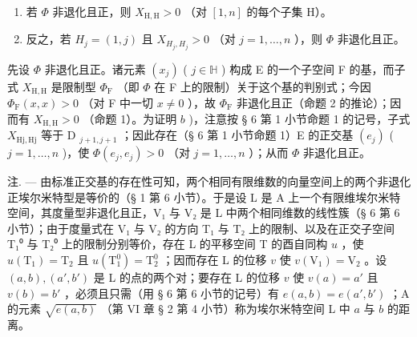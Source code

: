 \begin{enumerate}
\def\labelenumi{\alph{enumi})}
\item
  若 \(\Phi\) 非退化且正，则 \(X_{\mathrm{H,H}} > 0\) （对 \([1, n]\) 的每个子集 H）。
\item
  反之，若 \(H_{j} = (1, j)\) 且 \(X_{H_{j}, H_{j}} > 0\) （对 \(j = 1, \ldots, n\) ），则 \(\Phi\) 非退化且正。
\end{enumerate}

先设 \(\Phi\) 非退化且正。诸元素 \((x_{j})\) ( \(j\in\mathbb{H}\) ) 构成 E 的一个子空间 F 的基，而子式 \(X_{\mathrm{H,H}}\) 是限制型 \(\Phi_{\mathrm{F}}\) （即 \(\Phi\) 在 F 上的限制）关于这个基的判别式；今因 \(\Phi_{\mathrm{F}}(x,x)>0\) （对 F 中一切 \(x\neq0\) ），故 \(\Phi_{\mathrm{F}}\) 非退化且正（命题 2 的推论）；因而有 \(X_{\mathrm{H,H}}>0\) （命题 1）。为证明 \(b\) )，注意按 § 6 第 1 小节命题 1 的记号，子式 \(X_{\mathrm{Hj,Hj}}\) 等于 D \(_{j+1,j+1}\) ；因此存在（§ 6 第 1 小节命题 1）E 的正交基 \((e_{j})\) ( \(j=1,\ldots,n\) )，使 \(\Phi(e_{j},e_{j})>0\) （对 \(j=1,\ldots,n\) ）；从而 \(\Phi\) 非退化且正。

注. --- 由标准正交基的存在性可知，两个相同有限维数的向量空间上的两个非退化正埃尔米特型是等价的（§ 1 第 6 小节）。于是设 L 是 A 上一个有限维埃尔米特空间，其度量型非退化且正，V₁ 与 V₂ 是 L 中两个相同维数的线性簇（§ 6 第 6 小节）；由于度量式在 V₁ 与 V₂ 的方向 T₁ 与 T₂ 上的限制、以及在正交子空间 T₁⁰ 与 T₂⁰ 上的限制分别等价，存在 L 的平移空间 T 的酉自同构 \(u\) ，使 \(u(\mathrm{T}_1) = \mathrm{T}_2\) 且 \(u(\mathrm{T}_1^0) = \mathrm{T}_2^0\) ；因而存在 L 的位移 \(v\) 使 \(v(\mathrm{V}_1) = \mathrm{V}_2\) 。设 \((a, b), (a', b')\) 是 L 的点的两个对；要存在 L 的位移 \(v\) 使 \(v(a) = a'\) 且 \(v(b) = b'\) ，必须且只需（用 § 6 第 6 小节的记号）有 \(e(a, b) = e(a', b')\) ；A 的元素 \(\sqrt{e(a, b)}\) （第 VI 章 § 2 第 4 小节）称为埃尔米特空间 L 中 \(a\) 与 \(b\) 的距离。

